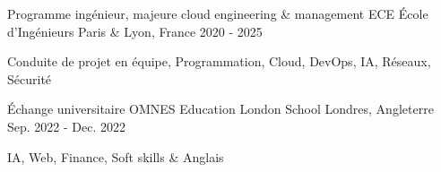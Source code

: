 

\begin{cventries}

    \cventry
    {Programme ingénieur, majeure cloud engineering \& management} %
    {ECE École d'Ingénieurs} %
    {Paris \& Lyon, France} %
    {2020 - 2025} %
    {
        \begin{cvitems} %
            \item {Conduite de projet en équipe, Programmation, Cloud, DevOps, IA, Réseaux, Sécurité}
        \end{cvitems}
    }

    \cventry
    {Échange universitaire} %
    {OMNES Education London School} %
    {Londres, Angleterre} %
    {Sep. 2022 - Dec. 2022} %
    {
        \begin{cvitems} %
            \item {IA, Web, Finance, Soft skills \& Anglais}
        \end{cvitems}
    }

\end{cventries}
